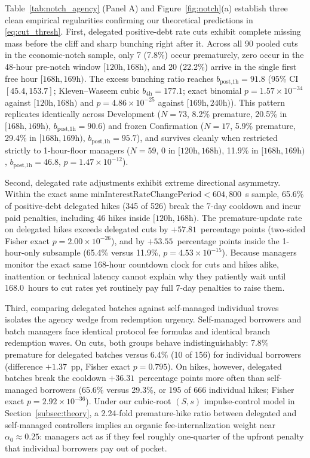 Table~\ref{tab:notch_agency} (Panel A) and Figure~\ref{fig:notch}(a) establish three clean empirical regularities confirming our theoretical predictions in \eqref{eq:cut_thresh}. First, delegated positive-debt rate cuts exhibit complete missing mass before the cliff and sharp bunching right after it. Across all 90 pooled cuts in the economic-notch sample, only 7 (7.8\%) occur prematurely, zero occur in the 48-hour pre-notch window $[120\text{h}, 168\text{h})$, and 20 (22.2\%) arrive in the single first free hour $[168\text{h}, 169\text{h})$. The excess bunching ratio reaches $b_{\text{post,1h}} = 91.8$ (95\% CI $[45.4, 153.7]$; Kleven--Waseem cubic $b_{4\text{h}} = 177.1$; exact binomial $p = 1.57 \times 10^{-34}$ against $[120\text{h}, 168\text{h})$ and $p = 4.86 \times 10^{-25}$ against $[169\text{h}, 240\text{h})$). This pattern replicates identically across Development ($N = 73$, 8.2\% premature, 20.5\% in $[168\text{h}, 169\text{h})$, $b_{\text{post,1h}} = 90.6$) and frozen Confirmation ($N = 17$, 5.9\% premature, 29.4\% in $[168\text{h}, 169\text{h})$, $b_{\text{post,1h}} = 95.7$), and survives cleanly when restricted strictly to 1-hour-floor managers ($N = 59$, 0 in $[120\text{h}, 168\text{h})$, 11.9\% in $[168\text{h}, 169\text{h})$, $b_{\text{post,1h}} = 46.8$, $p = 1.47 \times 10^{-12}$).

Second, delegated rate adjustments exhibit extreme directional asymmetry. Within the exact same $\text{minInterestRateChangePeriod} < 604{,}800$~s sample, 65.6\% of positive-debt delegated hikes (345 of 526) break the 7-day cooldown and incur paid penalties, including 46 hikes inside $[120\text{h}, 168\text{h})$. The premature-update rate on delegated hikes exceeds delegated cuts by $+57.81$~percentage points (two-sided Fisher exact $p = 2.00 \times 10^{-26}$), and by $+53.55$~percentage points inside the 1-hour-only subsample (65.4\% versus 11.9\%, $p = 4.53 \times 10^{-15}$). Because managers monitor the exact same 168-hour countdown clock for cuts and hikes alike, inattention or technical latency cannot explain why they patiently wait until 168.0~hours to cut rates yet routinely pay full 7-day penalties to raise them.

Third, comparing delegated batches against self-managed individual troves isolates the agency wedge from redemption urgency. Self-managed borrowers and batch managers face identical protocol fee formulas and identical branch redemption waves. On cuts, both groups behave indistinguishably: 7.8\% premature for delegated batches versus 6.4\% (10 of 156) for individual borrowers (difference $+1.37$~pp, Fisher exact $p = 0.795$). On hikes, however, delegated batches break the cooldown $+36.31$~percentage points more often than self-managed borrowers (65.6\% versus 29.3\%, or 195 of 666 individual hikes; Fisher exact $p = 2.92 \times 10^{-36}$). Under our cubic-root $(S,s)$ impulse-control model in Section~\ref{subsec:theory}, a 2.24-fold premature-hike ratio between delegated and self-managed controllers implies an organic fee-internalization weight near $\alpha_0 \approx 0.25$: managers act as if they feel roughly one-quarter of the upfront penalty that individual borrowers pay out of pocket.

